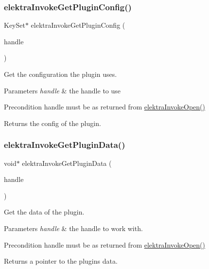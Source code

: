 \subsubsection{\texorpdfstring{elektra\+Invoke\+Get\+Plugin\+Config()}{elektraInvokeGetPluginConfig()}}
{\footnotesize\ttfamily Key\+Set$\ast$ elektra\+Invoke\+Get\+Plugin\+Config (\begin{DoxyParamCaption}\item[{Elektra\+Invoke\+Handle $\ast$}]{handle }\end{DoxyParamCaption})}



Get the configuration the plugin uses. 


\begin{DoxyParams}{Parameters}
{\em handle} & the handle to use\\
\hline
\end{DoxyParams}
\begin{DoxyPrecond}{Precondition}
handle must be as returned from \hyperlink{group__invoke_ga3eb20131e9a8fc9a6cebf126927c09bc}{elektra\+Invoke\+Open()}
\end{DoxyPrecond}
\begin{DoxyReturn}{Returns}
the config of the plugin. 
\end{DoxyReturn}
\mbox{\label{group__invoke_gac615e211a4d3c77addfa18152c274345}} 
\subsubsection{\texorpdfstring{elektra\+Invoke\+Get\+Plugin\+Data()}{elektraInvokeGetPluginData()}}
{\footnotesize\ttfamily void$\ast$ elektra\+Invoke\+Get\+Plugin\+Data (\begin{DoxyParamCaption}\item[{Elektra\+Invoke\+Handle $\ast$}]{handle }\end{DoxyParamCaption})}



Get the data of the plugin. 


\begin{DoxyParams}{Parameters}
{\em handle} & the handle to work with.\\
\hline
\end{DoxyParams}
\begin{DoxyPrecond}{Precondition}
handle must be as returned from \hyperlink{group__invoke_ga3eb20131e9a8fc9a6cebf126927c09bc}{elektra\+Invoke\+Open()}
\end{DoxyPrecond}
\begin{DoxyReturn}{Returns}
a pointer to the plugin\textquotesingle{}s data. 
\end{DoxyReturn}
\mbox{\label{group__invoke_ga13bd3afe428624d459239df73641d769}} 
